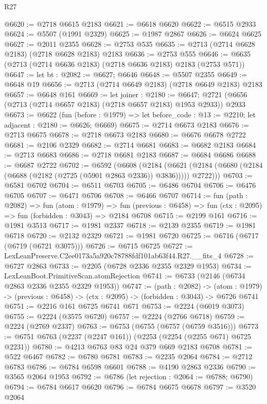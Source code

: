 \begin{lexlean}{R27}
\begin{coremodule}
@6620 := @2718 @6615 @2183
@6621 := @6618 @6620
@6622 := @6515 @2933
@6624 := @5507 (@1991 @2329)
@6625 := @1987 @2867
@6626 := @6624 @6625
@6627 := @2011 @2355
@6628 := @2753 @535
@6635 := @2713 (@2714 @6628 @2183) (@2718 @6628 @2183) @2183
@6636 := @2753 @555
@6646 := @6635 (@2713 (@2714 @6636 @2183) (@2718 @6636 @2183) @2183 (@2753 @571))
@6647 := let bt : @2082 := @6627; @6646
@6648 := @5507 @2355
@6649 := @6648 @19
@6656 := @2713 (@2714 @6649 @2183) (@2718 @6649 @2183) @2183
@6657 := @6648 @161
@6669 := let joiner : @2180 := @6647;
  @2721 (@6656 (@2713 (@2714 @6657 @2183) (@2718 @6657 @2183) @1953 @2933)) @2933
@6673 := @6622
    (fun (before : @1979) => let before_code : @13 := @2210; let adjacent : @2180 := @6626; @6669)
@6675 := @2714 @6673 @2183
@6676 := @2713 @6675
@6678 := @2718 @6673 @2183
@6680 := @6676 @6678 @2722
@6681 := @2106 @2329
@6682 := @2714 @6681
@6683 := @6682 @2183
@6684 := @2713 @6683
@6686 := @2718 @6681 @2183
@6687 := @6684 @6686
@6688 := @6687 @2722
@6702 := @6592
    (@6608
      (@2184
        (@6621 (@2184 (@6680 (@2184 (@6688 (@2182 (@2725 (@5901 @2863 @2336)) @3836))))) @2722)))
@6703 := @6581 @6702
@6704 := @6511 @6703
@6705 := @6486 @6704
@6706 := @6476 @6705
@6707 := @6471 @6706
@6708 := @6466 @6707
@6714 := fun (path : @2082) =>
  fun (atom : @1979) =>
  fun (previous : @6458) => fun (ctx : @2095) => fun (forbidden : @3043) => @2184 @6708
@6715 := @2199 @161
@6716 := @1981 @3513
@6717 := @1981 @2337
@6718 := @2139 @2355
@6719 := @1981 @6718
@6720 := @2132 @2329
@6721 := @1981 @6720
@6725 := @6716 (@6717 (@6719 (@6721 @3075)))
@6726 := @6715 @6725
@6727 := LexLeanPreserve.C2ee0173a5a920c78788fdf101ab63f44.R27.__fits_4
@6728 := @6727 @2863
@6733 := @2205 (@6728 @2336 @2355 @2329 @1953)
@6734 := LexLeanBoot.PrimitiveScan.atomRejection
@6741 := @6733 (@2146 (@6734 @2863 @2336 @2355 @2329 @1953))
@6747 := (path : @2082) ->
  (atom : @1979) -> (previous : @6458) -> (ctx : @2095) -> (forbidden : @3043) -> @6726 @6741
@6751 := @2216 @161 @6725 @6741 @671
@6753 := @2224 (@6019 @3073)
@6755 := @2224 (@3575 @6720)
@6757 := @2224 (@2766 @6718)
@6759 := @2224 (@2769 @2337)
@6763 := @6753 (@6755 (@6757 (@6759 @3516)))
@6773 := @6751 @6763 (@2237 (@2247 @161)) (@2253 (@2254 (@2255 @671) @6725 @2231))
@6780 := @4213 @6763 @83 @24 @379 @669 @2183 @6708
@6781 := @522 @6467
@6782 := @6780 @6781
@6783 := @2235 @2064
@6784 := @2712 @6783
@6786 := @6784 @6598 @6601
@6788 := @4190 @2863 @2336
@6790 := @3565 @2064 @1953
@6792 := @6786 (let rejection : @2064 := @6788; @6790)
@6794 := @6784 @6617 @6620
@6796 := @6784 @6675 @6678
@6797 := @3520 @2064

\end{coremodule}
\end{lexlean}
